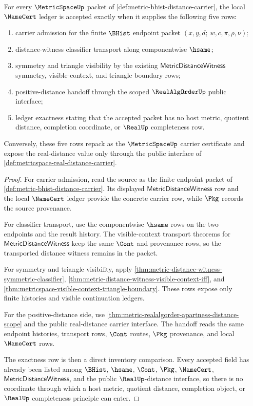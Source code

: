 \begin{theorem}
\label{thm:metric-bhist-distance-namecert-obligations}
For every $\MetricSpaceUp$ packet of
\autoref{def:metric-bhist-distance-carrier}, the local $\NameCert$ ledger is
accepted exactly when it supplies the following five rows:
\begin{enumerate}
  \item carrier admission for the finite $\BHist$ endpoint packet
  $(x,y,d;\ w,c,\pi,\rho,\nu)$;
  \item distance-witness classifier transport along componentwise $\hsame$;
  \item symmetry and triangle visibility by the existing
  $\mathsf{MetricDistanceWitness}$ symmetry, visible-context, and triangle
  boundary rows;
  \item positive-distance handoff through the scoped $\RealAlgOrderUp$
  public interface;
  \item ledger exactness stating that the accepted packet has no host metric,
  quotient distance, completion coordinate, or $\RealUp$ completeness row.
\end{enumerate}
Conversely, these five rows repack as the $\MetricSpaceUp$ carrier certificate
and expose the real-distance value only through the public interface of
\autoref{def:metricspace-real-distance-carrier}.
\end{theorem}
\begin{proof}
For carrier admission, read the source as the finite endpoint packet of
\autoref{def:metric-bhist-distance-carrier}. Its displayed
$\mathsf{MetricDistanceWitness}$ row and the local $\NameCert$ ledger provide
the concrete carrier row, while $\Pkg$ records the source provenance.

For classifier transport, use the componentwise $\hsame$ rows on the two
endpoints and the result history. The visible-context transport theorems for
$\mathsf{MetricDistanceWitness}$ keep the same $\Cont$ and provenance rows, so
the transported distance witness remains in the packet.

For symmetry and triangle visibility, apply
\autoref{thm:metric-distance-witness-symmetric-classifier},
\autoref{thm:metric-distance-witness-visible-context-iff}, and
\autoref{thm:metricspace-visible-context-triangle-boundary}. These rows expose
only finite histories and visible continuation ledgers.

For the positive-distance side, use
\autoref{thm:metric-realalgorder-apartness-distance-scope} and the public
real-distance carrier interface. The handoff reads the same endpoint
histories, transport rows, $\Cont$ routes, $\Pkg$ provenance, and local
$\NameCert$ rows.

The exactness row is then a direct inventory comparison. Every accepted field
has already been listed among $\BHist$, $\hsame$, $\Cont$, $\Pkg$,
$\NameCert$, $\mathsf{MetricDistanceWitness}$, and the public
$\RealUp$-distance interface, so there is no coordinate through which a host
metric, quotient distance, completion object, or $\RealUp$ completeness
principle can enter.
\end{proof}
